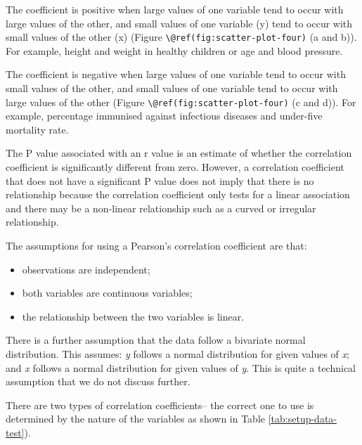 \documentclass[
]{memoir}
\providecommand{\tightlist}{%
  \setlength{\itemsep}{0pt}\setlength{\parskip}{0pt}}
\begin{document}
The coefficient is positive when large values of one variable tend to occur with large values of the other, and small values of one variable (y) tend to occur with small values of the other (x) (Figure \texttt{\textbackslash{}@ref(fig:scatter-plot-four)} (a and b)). For example, height and weight in healthy children or age and blood pressure.

The coefficient is negative when large values of one variable tend to occur with small values of the other, and small values of one variable tend to occur with large values of the other (Figure \texttt{\textbackslash{}@ref(fig:scatter-plot-four)} (c and d)). For example, percentage immunised against infectious diseases and under-five mortality rate.

The P value associated with an r value is an estimate of whether the correlation coefficient is significantly different from zero. However, a correlation coefficient that does not have a significant P value does not imply that there is no relationship because the correlation coefficient only tests for a linear association and there may be a non-linear relationship such as a curved or irregular relationship.

The assumptions for using a Pearson's correlation coefficient are that:

\begin{itemize}
\tightlist
\item
  observations are independent;
\item
  both variables are continuous variables;
\item
  the relationship between the two variables is linear.
\end{itemize}

There is a further assumption that the data follow a bivariate normal distribution. This assumes: \emph{y} follows a normal distribution for given values of \emph{x}; and \emph{x} follows a normal distribution for given values of \emph{y}. This is quite a technical assumption that we do not discuss further.

There are two types of correlation coefficients-- the correct one to use is determined by the nature of the variables as shown in Table \ref{tab:setup-data-test}).

 
  \providecommand{\huxb}[2]{\arrayrulecolor[RGB]{#1}\global\arrayrulewidth=#2pt}
  \providecommand{\huxvb}[2]{\color[RGB]{#1}\vrule width #2pt}
  \providecommand{\huxtpad}[1]{\rule{0pt}{#1}}
  \providecommand{\huxbpad}[1]{\rule[-#1]{0pt}{#1}}
\end{document}
